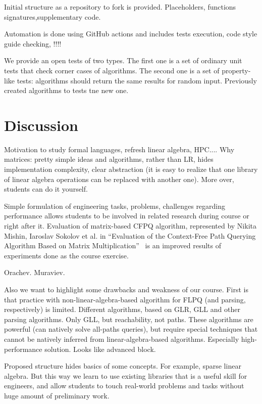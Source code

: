 \documentclass[sigconf]{acmart}
\begin{document}
Initial structure as a repository to fork is provided. 
Placeholders, functions signatures,supplementary code.

Automation is done using GitHub actions and includes tests execution, code style guide checking, !!!!

We provide an open tests of two types.
The first one is a set of ordinary unit tests that check corner cases of algorithms.
The second one is a set of property-like tests: algorithms should return the same results for random input.
Previously created algorithms to tests tne new one.

\section{Discussion}

Motivation to study formal languages, refresh linear algebra, HPC....
Why matrices: pretty simple ideas and algorithms, rather than LR, hides implementation complexity, clear abstraction (it is easy to realize that one library of linear algebra operations can be replaced with another one). More over, students can do it yourself.

Simple formulation of engineering tasks, problems, challenges regarding performance allows students to be involved in related research during course or right after it. 
Evaluation of matrix-based CFPQ algorithm, represented by Nikita Mishin, Iaroslav Sokolov et al. in ``Evaluation of the Context-Free Path Querying Algorithm Based on Matrix Multiplication''~\cite{10.1145/3327964.3328503} is an improved results of experiments done as the course exercise. 

Orachev.
Muraviev.

Also we want to highlight some drawbacks and weakness of our course.
First is that practice with non-linear-algebra-based algorithm for FLPQ (and parsing, respectively) is limited. 
Different algorithms, based on GLR, GLL and other parsing algorithms. 
Only GLL, but reachability, not paths.
These algorithms are powerful (can natively solve all-paths queries), but require special techniques that cannot be natively inferred from linear-algebra-based algorithms.
Especially high-performance solution.
Looks like advanced block. 

Proposed structure hides basics of some concepts. 
For example, sparse linear algebra.
But this way we learn to use existing libraries that is a useful skill for engineers, and allow students to touch real-world problems and tasks without huge amount of preliminary work.
\end{document}
